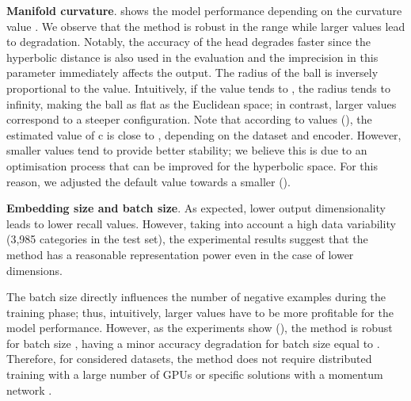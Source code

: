 \documentclass[10pt,twocolumn,letterpaper]{article}
\begin{document}
{\bf Manifold curvature}.
 shows the model performance depending on the curvature value . We observe that the method is robust in the range  while larger values lead to degradation. Notably, the accuracy of the head degrades faster since the hyperbolic distance is also used in the evaluation and the imprecision in this parameter immediately affects the output. The radius of the ball is inversely proportional to the  value. Intuitively, if the  value tends to , the radius tends to infinity, making the ball as flat as the Euclidean space; in contrast, larger  values correspond to a steeper configuration.
Note that according to  values (), the estimated value of c is close to , depending on the dataset and encoder. However, smaller values tend to provide better stability; we believe this is due to an optimisation process that can be improved for the hyperbolic space. For this reason, we adjusted the default value towards a smaller  ().

{\bf Embedding size and batch size}.
As expected, lower output dimensionality leads to lower recall values. However, taking into account a high data variability (3,985 categories in the test set), the experimental results suggest that the method has a reasonable representation power even in the case of lower dimensions.

The batch size directly influences the number of negative examples during the training phase; thus, intuitively, larger values have to be more profitable for the model performance. However, as the experiments show (), the method is robust for batch size , having a minor accuracy degradation for batch size equal to . Therefore, for considered datasets, the method does not require distributed training with a large number of GPUs \cite{simclr} or specific solutions with a momentum network \cite{moco}.
\end{document}
